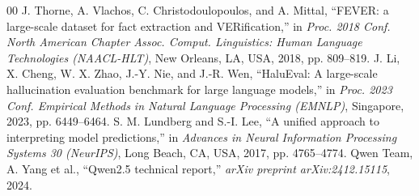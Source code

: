 \documentclass[conference]{IEEEtran}
\begin{document}
\begin{thebibliography}{00}
 J. Thorne, A. Vlachos, C. Christodoulopoulos, and A. Mittal, ``FEVER: a large-scale dataset for fact extraction and VERification,'' in \textit{Proc. 2018 Conf. North American Chapter Assoc. Comput. Linguistics: Human Language Technologies (NAACL-HLT)}, New Orleans, LA, USA, 2018, pp. 809--819.
 J. Li, X. Cheng, W. X. Zhao, J.-Y. Nie, and J.-R. Wen, ``HaluEval: A large-scale hallucination evaluation benchmark for large language models,'' in \textit{Proc. 2023 Conf. Empirical Methods in Natural Language Processing (EMNLP)}, Singapore, 2023, pp. 6449--6464.
 S. M. Lundberg and S.-I. Lee, ``A unified approach to interpreting model predictions,'' in \textit{Advances in Neural Information Processing Systems 30 (NeurIPS)}, Long Beach, CA, USA, 2017, pp. 4765--4774.
 Qwen Team, A. Yang et al., ``Qwen2.5 technical report,'' \textit{arXiv preprint arXiv:2412.15115}, 2024.
\end{thebibliography}
\end{document}
